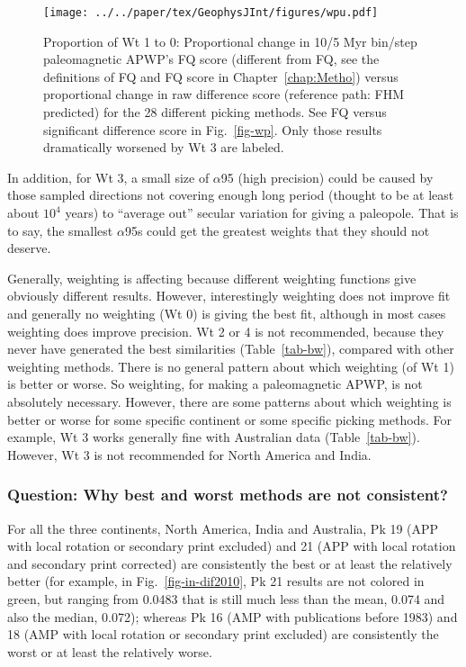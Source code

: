 \begin{figure*}
\centering
\texttt{[image: ../../paper/tex/GeophysJInt/figures/wpu.pdf]}
\caption[Proportional changes of Wt 1 to 0: Paleomagnetic
APWP's FQ score vs raw difference score]{Proportion of Wt
1 to 0: Proportional change in 10/5 Myr bin/step paleomagnetic
APWP's FQ score (different from FQ, see the definitions of FQ and FQ score in
Chapter~\ref{chap:Metho}) versus proportional change in raw difference score (reference path:
FHM predicted) for the 28 different picking methods. See FQ versus significant
difference score in Fig.~\ref{fig-wp}. Only those results dramatically worsened
by Wt 3 are labeled.}\label{fig-wpu}
\end{figure*}

In addition, for Wt 3, a small size of $\alpha$95 (high precision) could be
caused by those sampled directions not covering enough long period (thought to
be at least about $10^4$ years) to ``average out'' secular variation for giving
a paleopole. That is to say, the smallest $\alpha$95s could get the greatest
weights that they should not deserve.

Generally, weighting is affecting because different weighting functions give
obviously different results. However, interestingly weighting does not improve
fit and generally no weighting (Wt 0) is giving the best fit, although in most
cases weighting does improve precision. Wt 2 or 4 is not recommended, because
they never have generated the best similarities (Table~\ref{tab-bw}), compared
with other weighting methods. There is no general pattern about which weighting
(of Wt 1) is better or worse. So weighting, for making a
paleomagnetic APWP, is not absolutely necessary. However, there are some
patterns about which weighting is better or worse for some specific continent or
some specific picking methods. For example, Wt 3 works generally fine with
Australian data (Table~\ref{tab-bw}). However, Wt 3 is not recommended for North
America and India.

\subsubsection{Question: Why best and worst methods are not consistent?}

For all the three continents, North America, India and Australia, Pk
19 (APP with local rotation or secondary print excluded) and 21 (APP
with local rotation and secondary print corrected) are consistently the best or
at least the relatively better (for example, in Fig.~\ref{fig-in-dif2010},
Pk 21 results are not colored in green, but ranging from
0.0483 that is still much less than the mean, 0.074 and also
the median, 0.072); whereas Pk 16 (AMP with publications before
1983) and 18 (AMP with local rotation or secondary print excluded) are
consistently the worst or at least the relatively worse.

